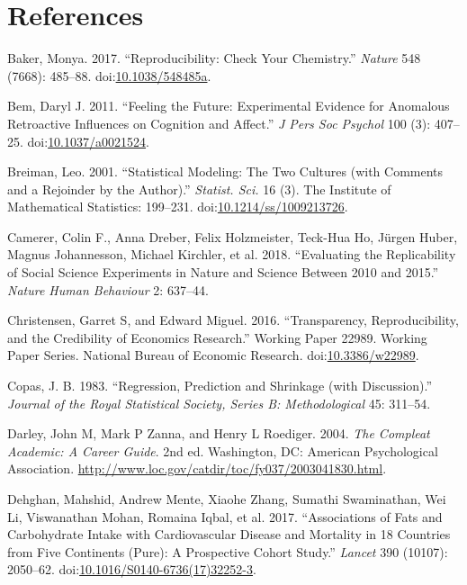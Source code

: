 \documentclass[]{book}
\theoremstyle{definition}
\theoremstyle{definition}
\theoremstyle{definition}
\theoremstyle{remark}
\begin{document}
\chapter{References}\label{references}

\hypertarget{refs}{}
\hypertarget{ref-bake:2017}{}
Baker, Monya. 2017. ``Reproducibility: Check Your Chemistry.''
\emph{Nature} 548 (7668): 485--88.
doi:\href{https://doi.org/10.1038/548485a}{10.1038/548485a}.

\hypertarget{ref-bem:2011}{}
Bem, Daryl J. 2011. ``Feeling the Future: Experimental Evidence for
Anomalous Retroactive Influences on Cognition and Affect.'' \emph{J Pers
Soc Psychol} 100 (3): 407--25.
doi:\href{https://doi.org/10.1037/a0021524}{10.1037/a0021524}.

\hypertarget{ref-breiman2001}{}
Breiman, Leo. 2001. ``Statistical Modeling: The Two Cultures (with
Comments and a Rejoinder by the Author).'' \emph{Statist. Sci.} 16 (3).
The Institute of Mathematical Statistics: 199--231.
doi:\href{https://doi.org/10.1214/ss/1009213726}{10.1214/ss/1009213726}.

\hypertarget{ref-Camerer2018EvaluatingTR}{}
Camerer, Colin F., Anna Dreber, Felix Holzmeister, Teck-Hua Ho, Jürgen
Huber, Magnus Johannesson, Michael Kirchler, et al. 2018. ``Evaluating
the Replicability of Social Science Experiments in Nature and Science
Between 2010 and 2015.'' \emph{Nature Human Behaviour} 2: 637--44.

\hypertarget{ref-NBERw22989}{}
Christensen, Garret S, and Edward Miguel. 2016. ``Transparency,
Reproducibility, and the Credibility of Economics Research.'' Working
Paper 22989. Working Paper Series. National Bureau of Economic Research.
doi:\href{https://doi.org/10.3386/w22989}{10.3386/w22989}.

\hypertarget{ref-copa:1983}{}
Copas, J. B. 1983. ``Regression, Prediction and Shrinkage (with
Discussion).'' \emph{Journal of the Royal Statistical Society, Series B:
Methodological} 45: 311--54.

\hypertarget{ref-darl:zann:roed:2004}{}
Darley, John M, Mark P Zanna, and Henry L Roediger. 2004. \emph{The
Compleat Academic: A Career Guide}. 2nd ed. Washington, DC: American
Psychological Association.
\url{http://www.loc.gov/catdir/toc/fy037/2003041830.html}.

\hypertarget{ref-dehg:ment:zhan:2017}{}
Dehghan, Mahshid, Andrew Mente, Xiaohe Zhang, Sumathi Swaminathan, Wei
Li, Viswanathan Mohan, Romaina Iqbal, et al. 2017. ``Associations of
Fats and Carbohydrate Intake with Cardiovascular Disease and Mortality
in 18 Countries from Five Continents (Pure): A Prospective Cohort
Study.'' \emph{Lancet} 390 (10107): 2050--62.
doi:\href{https://doi.org/10.1016/S0140-6736(17)32252-3}{10.1016/S0140-6736(17)32252-3}.
\end{document}
